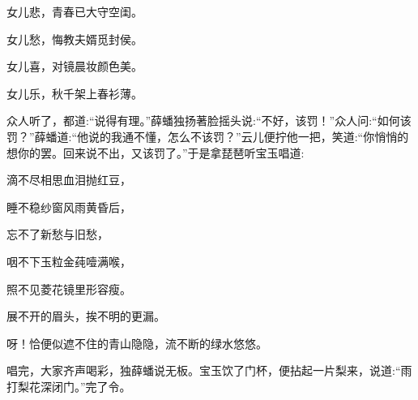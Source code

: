 \begin{poem}
    \begin{pl} 女儿悲，青春已大守空闺。\end{pl}

    \begin{pl} 女儿愁，悔教夫婿觅封侯。\end{pl}

    \begin{pl} 女儿喜，对镜晨妆颜色美。\end{pl}

    \begin{pl} 女儿乐，秋千架上春衫薄。\end{pl}
\end{poem}


\begin{parag}
    众人听了，都道:“说得有理。”薛蟠独扬著脸摇头说:“不好，该罚！”众人问:“如何该罚？”薛蟠道:“他说的我通不懂，怎么不该罚？”云儿便拧他一把，笑道:“你悄悄的想你的罢。回来说不出，又该罚了。”于是拿琵琶听宝玉唱道:
\end{parag}


\begin{poem}
    \begin{pl}滴不尽相思血泪抛红豆，\end{pl}

    \begin{pl}睡不稳纱窗风雨黄昏后，\end{pl}

    \begin{pl}忘不了新愁与旧愁，\end{pl}

    \begin{pl}咽不下玉粒金莼噎满喉，\end{pl}

    \begin{pl}照不见菱花镜里形容瘦。\end{pl}

    \begin{pl}展不开的眉头，挨不明的更漏。\end{pl}

    \begin{pl}呀！恰便似遮不住的青山隐隐，流不断的绿水悠悠。\end{pl}
\end{poem}


\begin{parag}
    唱完，大家齐声喝彩，独薛蟠说无板。宝玉饮了门杯，便拈起一片梨来，说道:“雨打梨花深闭门。”完了令。
\end{parag}


